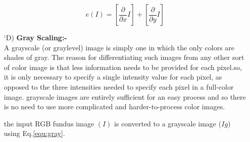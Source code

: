 \begin{itemize}[labelindent=1em,labelsep=0.25cm,leftmargin=*]
        \begin{equation}
            e(I) = [\frac{\partial}{\partial x} I] + [\frac{\partial}{\partial y} I]
            \label{equ:blur}
        \end{equation}
        \item[\char `D)] \textbf{Gray Scaling:-}\\
        A grayscale (or graylevel) image is simply one in which the only colors are shades of gray. The reason for differentiating such images from any other sort of color image is that less information needs to be provided for each pixel.so, it is only necessary to specify a single intensity value for each pixel, as opposed to the three intensities needed to specify each pixel in a full-color image.
        grayscale images are entirely sufficient for an easy process and so there is no need to use more complicated and harder-to-process color images.
        
        the input RGB fundus image $(I)$ is converted to a grayscale image ($Ig$) using Eq.\ref{equ:gray}.
        

\end{itemize}
